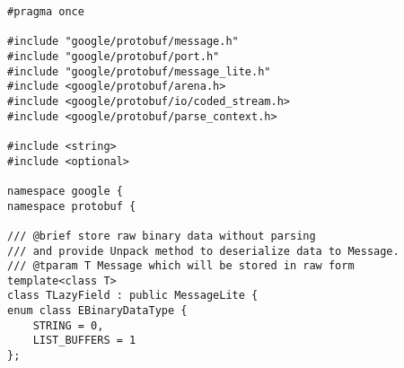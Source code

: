 \begin{lstlisting}[style=CodeListing, label=sec_impl:code:lazy_field_h, caption={Определение класса LazyField}]
#pragma once

#include "google/protobuf/message.h"
#include "google/protobuf/port.h"
#include "google/protobuf/message_lite.h"
#include <google/protobuf/arena.h>
#include <google/protobuf/io/coded_stream.h>
#include <google/protobuf/parse_context.h>

#include <string>
#include <optional>

namespace google {
namespace protobuf {

/// @brief store raw binary data without parsing
/// and provide Unpack method to deserialize data to Message.
/// @tparam T Message which will be stored in raw form
template<class T>
class TLazyField : public MessageLite {
enum class EBinaryDataType {
    STRING = 0,
    LIST_BUFFERS = 1
};

\end{lstlisting}
\pagebreak
